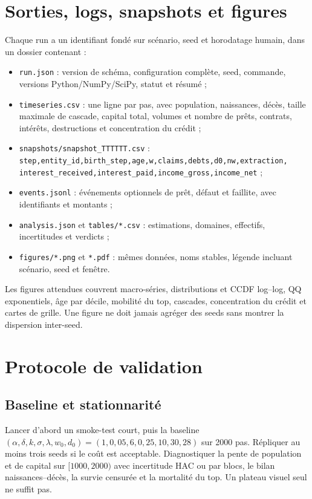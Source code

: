 \documentclass[11pt,a4paper]{article}
\newcommand{\code}[1]{\texttt{#1}}
\begin{document}
\section{Sorties, logs, snapshots et figures}

Chaque run a un identifiant fondé sur scénario, seed et horodatage humain, dans
un dossier contenant :
\begin{itemize}
  \item \code{run.json} : version de schéma, configuration complète, seed,
  commande, versions Python/NumPy/SciPy, statut et résumé ;
  \item \code{timeseries.csv} : une ligne par pas, avec population, naissances,
  décès, taille maximale de cascade, capital total, volumes et nombre de prêts,
  contrats, intérêts, destructions et concentration du crédit ;
  \item \code{snapshots/snapshot\_TTTTTT.csv} :
  \code{step,entity\_id,birth\_step,age,w,claims,debts,d0,nw,extraction,
  interest\_received,interest\_paid,income\_gross,income\_net} ;
  \item \code{events.jsonl} : événements optionnels de prêt, défaut et faillite,
  avec identifiants et montants ;
  \item \code{analysis.json} et \code{tables/*.csv} : estimations, domaines,
  effectifs, incertitudes et verdicts ;
  \item \code{figures/*.png} et \code{*.pdf} : mêmes données, noms stables,
  légende incluant scénario, seed et fenêtre.
\end{itemize}

Les figures attendues couvrent macro-séries, distributions et CCDF log--log,
QQ exponentiels, âge par décile, mobilité du top, cascades, concentration du
crédit et cartes de grille. Une figure ne doit jamais agréger des seeds sans
montrer la dispersion inter-seed.

\section{Protocole de validation}

\subsection{Baseline et stationnarité}

Lancer d'abord un smoke-test court, puis la baseline
$(\alpha,\delta,k,\sigma,\lambda,w_0,d_0)=(1,0{,}05,6,0{,}25,10,30,28)$ sur
2000 pas. Répliquer au moins trois seeds si le coût est acceptable. Diagnostiquer
la pente de population et de capital sur $[1000,2000)$ avec incertitude HAC ou
par blocs, le bilan naissances--décès, la survie censurée et la mortalité du top.
Un plateau visuel seul ne suffit pas.
\end{document}

